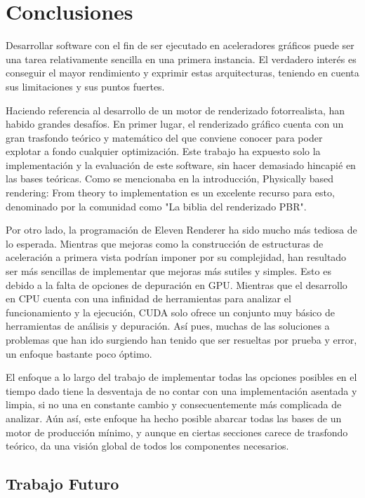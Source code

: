 \chapter{Conclusiones}
\label{chap:6}
	
Desarrollar software con el fin de ser ejecutado en aceleradores gráficos puede ser una tarea relativamente sencilla en una primera instancia. El verdadero interés es conseguir el mayor rendimiento y exprimir estas arquitecturas, teniendo en cuenta sus limitaciones y sus puntos fuertes. 

Haciendo referencia al desarrollo de un motor de renderizado fotorrealista, han habido grandes desafíos. En primer lugar, el renderizado gráfico cuenta con un gran trasfondo teórico y matemático del que conviene conocer para poder explotar a fondo cualquier optimización. Este trabajo ha expuesto solo la implementación y la evaluación de este software, sin hacer demasiado hincapié en las bases teóricas. Como se mencionaba en la introducción, Physically based rendering: From theory to implementation \cite{pharr2016physically} es un excelente recurso para esto, denominado por la comunidad como "La biblia del renderizado PBR".

Por otro lado, la programación de Eleven Renderer ha sido mucho más tediosa de lo esperada. Mientras que mejoras como la construcción de estructuras de aceleración a primera vista podrían imponer por su complejidad, han resultado ser más sencillas de implementar que mejoras más sutiles y simples. Esto es debido a la falta de opciones de depuración en GPU. Mientras que el desarrollo en CPU cuenta con una infinidad de herramientas para analizar el funcionamiento y la ejecución, CUDA solo ofrece un conjunto muy básico de herramientas de análisis y depuración. Así pues, muchas de las soluciones a problemas que han ido surgiendo han tenido que ser resueltas por prueba y error, un enfoque bastante poco óptimo.

El enfoque a lo largo del trabajo de implementar todas las opciones posibles en el tiempo dado tiene la desventaja de no contar con una implementación asentada y limpia, si no una en constante cambio y consecuentemente más complicada de analizar. Aún así, este enfoque ha hecho posible abarcar todas las bases de un motor de producción mínimo, y aunque en ciertas secciones carece de trasfondo teórico, da una visión global de todos los componentes necesarios.

\section{Trabajo Futuro}
	

